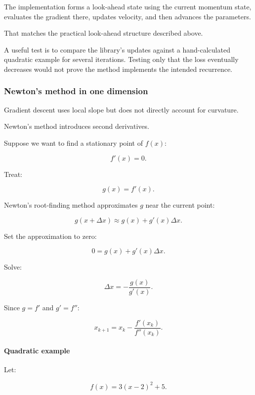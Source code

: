 The  implementation forms a look-ahead state using the current momentum state, evaluates the gradient there, updates velocity, and then advances the parameters.

That matches the practical look-ahead structure described above.

A useful test is to compare the library's updates against a hand-calculated quadratic example for several iterations. Testing only that the loss eventually decreases would not prove the method implements the intended recurrence.

\subsubsection{Newton's method in one dimension}\label{02-foundations-ii-ch026-newtons-method-in-one-dimension}

\hypertarget{02-foundations-ii-ch026-newtons-method-in-one-dimension}{}

Gradient descent uses local slope but does not directly account for curvature.

Newton's method introduces second derivatives.

Suppose we want to find a stationary point of \(f(x)\):

\[
f'(x)=0.
\]

Treat:

\[
g(x)=f'(x).
\]

Newton's root-finding method approximates \(g\) near the current point:

\[
g(x+\Delta x) \approx g(x)+g'(x)\Delta x.
\]

Set the approximation to zero:

\[
0=g(x)+g'(x)\Delta x.
\]

Solve:

\[
\Delta x=-\frac{g(x)}{g'(x)}.
\]

Since \(g=f'\) and \(g'=f''\):

\[
\boxed{ x_{k+1} = x_k-\frac{f'(x_k)}{f''(x_k)} }.
\]

\paragraph{Quadratic example}\label{02-foundations-ii-ch026-quadratic-example}

\hypertarget{02-foundations-ii-ch026-quadratic-example}{}

Let:

\[
f(x)=3(x-2)^2+5.
\]

